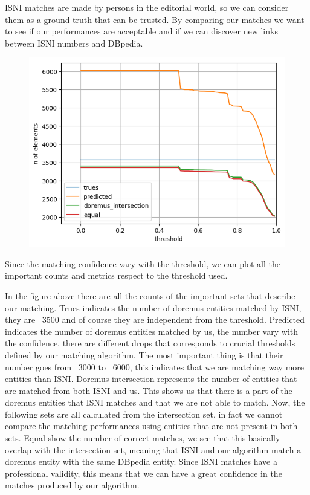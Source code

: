 \documentclass[paper=a4, fontsize=11pt]{scrartcl}
\begin{document}
ISNI matches are made by persons in the editorial world, so we can consider them as a ground truth that can be trusted. By comparing our matches we want to see if our performances are acceptable and if we can discover new links between ISNI numbers and DBpedia.

\begin{figure}
\centering
\includegraphics[]{images/counts_artists.png}\\
\end{figure}

Since the matching confidence vary with the threshold, we can plot all the important counts and metrics respect to the threshold used.

In the figure above there are all the counts of the important sets that describe our matching.
Trues indicates the number of doremus entities matched by ISNI, they are ~3500 and of course they are independent from the threshold.
Predicted indicates the number of doremus entities matched by us, the number vary with the confidence, there are different drops that corresponds to crucial thresholds defined by our matching algorithm. The most important thing is that their number goes from ~3000 to ~6000, this indicates that we are matching way more entities than ISNI.
Doremus intersection represents the number of entities that are matched from both ISNI and us. This shows us that there is a part of the doremus entities that ISNI matches and that we are not able to match.
Now, the following sets are all calculated from the intersection set, in fact we cannot compare the matching performances using entities that are not present in both sets.
Equal show the number of correct matches, we see that this basically overlap with the intersection set, meaning that ISNI and our algorithm match a doremus entity with the same DBpedia entity. Since ISNI matches have a professional validity, this means that we can have a great confidence in the matches produced by our algorithm.
\end{document}
